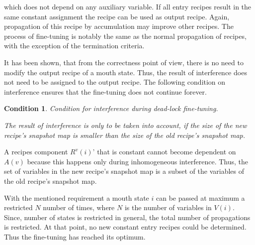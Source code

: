 \documentclass[12pt,a4paper]{scrartcl}
\newtheorem{condition}{Condition}
\begin{document}
which does not depend on any auxiliary variable. If all entry recipes result in
the same constant assignment the recipe can be used as output recipe. Again,
propagation of this recipe by accumulation may improve other recipes. The process
of fine-tuning is notably the same as the normal propagation of recipes, with 
the exception of the termination criteria.

It has been shown, that from the correctness point of view, there is no need to
modify the output recipe of a mouth state. Thus, the result of interference
does not need to be assigned to the output recipe. The following condition 
on interference ensures that the fine-tuning does not continue forever.

\begin{condition}
Condition for interference during dead-lock fine-tuning.

The result of interference is only to be taken into account, if the size of the
new recipe's snapshot map is smaller than the size of the old recipe's snapshot
map.  
\end{condition}

A recipes component $R^v(i)$' that is constant cannot become dependent on
$A(v)$ because this happens only during inhomogeneous interference. Thus, the
set of variables in the new recipe's snapshot map is a subset of the variables
of the old recipe's snapshot map.

With the mentioned requirement a mouth state $i$ can be passed at maximum a
restricted $N$ number of times, where $N$ is the number of variables in
$V(i)$. Since, number of states is restricted in general, the total number of
propagations is restricted. At that point, no new constant entry recipes could
be determined. Thus the fine-tuning has reached its optimum.
\end{document}
